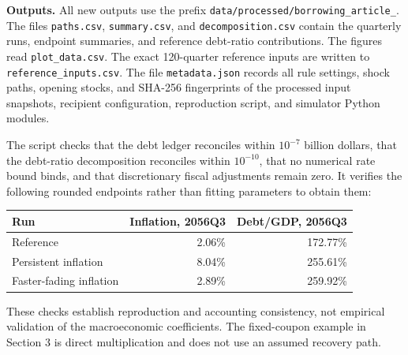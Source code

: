 \documentclass[11pt,letterpaper]{article}
\newcommand{\pathfile}[1]{\nolinkurl{#1}}
\begin{document}
\textbf{Outputs.}
All new outputs use the prefix \pathfile{data/processed/borrowing_article_}.
The files \pathfile{paths.csv}, \pathfile{summary.csv}, and
\pathfile{decomposition.csv} contain the quarterly runs, endpoint summaries,
and reference debt-ratio contributions. The figures read
\pathfile{plot_data.csv}. The exact 120-quarter reference inputs are written
to \pathfile{reference_inputs.csv}. The file \pathfile{metadata.json} records
all rule settings, shock paths, opening stocks, and SHA-256 fingerprints
of the processed input snapshots, recipient configuration, reproduction
script, and simulator Python modules.

The script checks that the debt ledger reconciles within \(10^{-7}\) billion
dollars, that the debt-ratio decomposition reconciles within \(10^{-10}\),
that no numerical rate bound binds, and that discretionary fiscal adjustments
remain zero. It verifies the following rounded endpoints rather than fitting
parameters to obtain them:
\begin{center}
\begin{tabular}{lrr}
\toprule
Run & Inflation, 2056Q3 & Debt/GDP, 2056Q3\\
\midrule
Reference & 2.06\% & 172.77\%\\
Persistent inflation & 8.04\% & 255.61\%\\
Faster-fading inflation & 2.89\% & 259.92\%\\
\bottomrule
\end{tabular}
\end{center}
These checks establish reproduction and accounting consistency, not empirical
validation of the macroeconomic coefficients. The fixed-coupon example in
Section 3 is direct multiplication and does not use an assumed recovery path.
\end{document}
